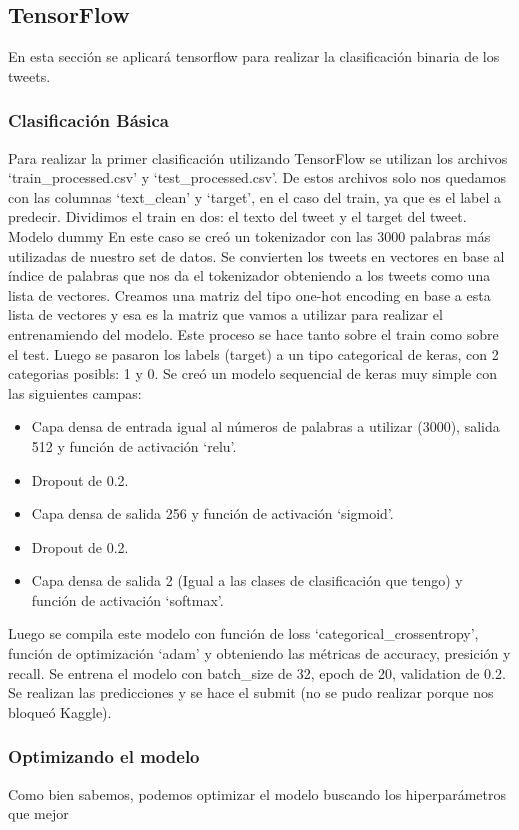 \documentclass[12pt]{article}
\begin{document}
\subsection{TensorFlow}
En esta sección se aplicará tensorflow para realizar la clasificación binaria de los tweets.


\subsubsection{Clasificación Básica}
Para realizar la primer clasificación utilizando TensorFlow se utilizan los archivos ‘train\_processed.csv’ y ‘test\_processed.csv’.
De estos archivos solo nos quedamos con las columnas ‘text\_clean’ y ‘target’, en el caso del train, ya que es el label a predecir.
Dividimos el train en dos: el texto del tweet y el target del tweet.
Modelo dummy
En este caso se creó un tokenizador con las 3000 palabras más utilizadas de nuestro set de datos.
Se convierten los tweets en vectores en base al índice de palabras que nos da el tokenizador obteniendo a los tweets como una lista de vectores.
Creamos una matriz del tipo one-hot encoding en base a esta lista de vectores y esa es la matriz que vamos a utilizar para realizar el entrenamiendo del modelo. Este proceso se hace tanto sobre el train como sobre el test.
Luego se pasaron los labels (target) a un tipo categorical de keras, con 2 categorias posibls: 1 y 0.
Se creó un modelo sequencial de keras muy simple con las siguientes campas:
\begin{itemize}
  \item Capa densa de entrada igual al números de palabras a utilizar (3000), salida 512 y función de activación ‘relu’.
  \item Dropout de 0.2.
  \item Capa densa de salida 256 y función de activación ‘sigmoid’.
  \item Dropout de 0.2.
  \item Capa densa de salida 2 (Igual a las clases de clasificación que tengo) y función de activación ‘softmax’.
\end{itemize}
Luego se compila este modelo con función de loss ‘categorical\_crossentropy’, función de optimización ‘adam’ y obteniendo las métricas de accuracy, presición y recall.
Se entrena el modelo con batch\_size de 32, epoch de 20, validation de 0.2.
Se realizan las predicciones y se hace el submit (no se pudo realizar porque nos bloqueó Kaggle).


\subsubsection{Optimizando el modelo}
Como bien sabemos, podemos optimizar el modelo buscando los hiperparámetros que mejor 
\end{document}
